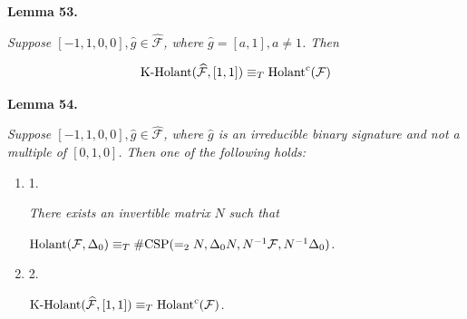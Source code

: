 

\par\medskip\noindent\textbf{
\textbf{Lemma 53}\textbf{.}
}\par



\emph{Suppose $[-1,1,0,0],\widehat{g}\in\widehat{\mathcal{F}}$, where $\widehat{g}=[a,1],a\neq 1$. Then}\par


\[\begin{gathered}
\textup{{K-Holant}}(\widehat{\mathcal{F}},[1,1])\equiv_{T}\textup{{Holant}}^{c}(\mathcal{F})
\end{gathered}\]







\par\medskip\noindent\textbf{
\textbf{Lemma 54}\textbf{.}
}\par



\emph{Suppose $[-1,1,0,0],\widehat{g}\in\widehat{\mathcal{F}}$, where $\widehat{g}$ is an irreducible binary signature and not a multiple of $[0,1,0]$. Then one of the following holds:}\par


\begin{enumerate}


\item[] 
1. 


\emph{There exists an invertible matrix }$N$\emph{ such that}\par




$\textup{{Holant}}(\mathcal{F},\Delta_{0})\equiv_{T}\textup{{\#CSP}}(=_{2}N,\Delta_{0}N,N^{-1}\mathcal{F},N^{-1}\Delta_{0})$\emph{.}\par





\item[] 
2. 


$\textup{{K-Holant}}(\widehat{\mathcal{F}},[1,1])\equiv_{T}\textup{{Holant}}^{c}(\mathcal{F})$\emph{.}\par





\end{enumerate}



